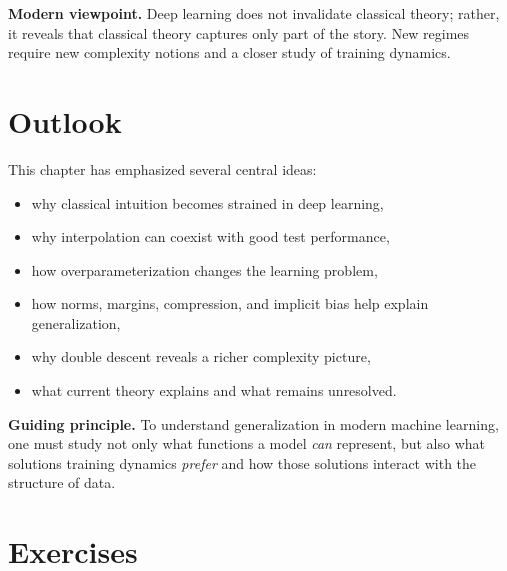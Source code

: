 \medskip

\noindent
\textbf{Modern viewpoint.}
Deep learning does not invalidate classical theory; rather, it reveals that classical theory captures only part of the story. New regimes require new complexity notions and a closer study of training dynamics.

\section{Outlook}

This chapter has emphasized several central ideas:
\begin{itemize}
    \item why classical intuition becomes strained in deep learning,
    \item why interpolation can coexist with good test performance,
    \item how overparameterization changes the learning problem,
    \item how norms, margins, compression, and implicit bias help explain generalization,
    \item why double descent reveals a richer complexity picture,
    \item what current theory explains and what remains unresolved.
\end{itemize}

\medskip

\noindent
\textbf{Guiding principle.}
To understand generalization in modern machine learning, one must study not only what functions a model \emph{can} represent, but also what solutions training dynamics \emph{prefer} and how those solutions interact with the structure of data.

\section*{Exercises}

